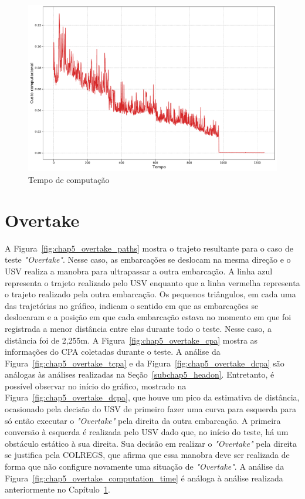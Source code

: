         \begin{figure}[H]
            \centering
            \includegraphics[width=\textwidth]{fig/chap5/headon_computation_time.pdf}
            \caption{Tempo de computação}
            \label{fig:chap5_headon_computation_time}
        \end{figure}
        
    \section{Overtake} \label{subchap5_overtake}
        A Figura~\ref{fig:chap5_overtake_paths} mostra o trajeto resultante para o caso de teste \textit{"Overtake"}. Nesse caso, as embarcações se deslocam na mesma direção e o USV realiza a manobra para ultrapassar a outra embarcação. A linha azul representa o trajeto realizado pelo USV enquanto que a linha vermelha representa o trajeto realizado pela outra embarcação. Os pequenos triângulos, em cada uma das trajetórias no gráfico, indicam o sentido em que as embarcações se deslocaram e a posição em que cada embarcação estava no momento em que foi registrada a menor distância entre elas durante todo o teste. Nesse caso, a distância foi de 2,255m. A Figura~\ref{fig:chap5_overtake_cpa} mostra as informações do CPA coletadas durante o teste. A análise da Figura~\ref{fig:chap5_overtake_tcpa} e da Figura~\ref{fig:chap5_overtake_dcpa} são análogas às análises realizadas na Seção~\ref{subchap5_headon}. Entretanto, é possível observar no início do gráfico, mostrado na Figura~\ref{fig:chap5_overtake_dcpa}, que houve um pico da estimativa de 
        distância, ocasionado pela decisão do USV de primeiro fazer uma curva para esquerda para só então executar o \textit{"Overtake"} pela direita da outra embarcação. A primeira conversão à esquerda é realizada pelo USV dado que, no início do teste, há um obstáculo estático à sua direita. Sua decisão em realizar o \textit{"Overtake"} pela direita se justifica pela COLREGS, que afirma que essa manobra deve ser realizada de forma que não configure novamente uma situação de \textit{"Overtake"}. A análise da Figura~\ref{fig:chap5_overtake_computation_time} é análoga à análise realizada anteriormente no Capítulo~\ref{subchap5_overtake}.
       
